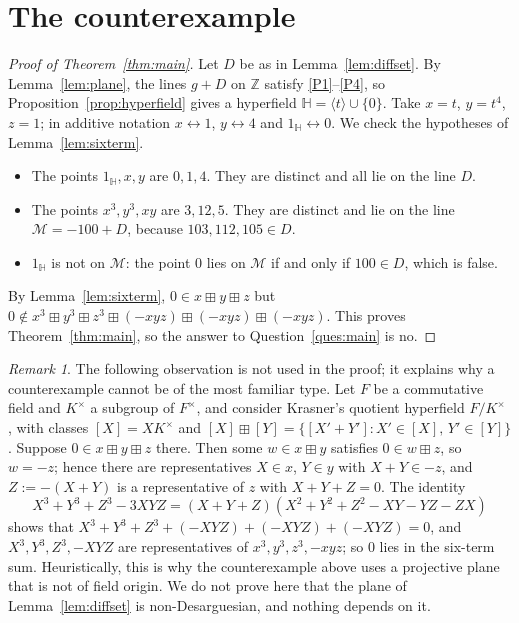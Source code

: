 \documentclass[11pt]{article}
\theoremstyle{definition}
\theoremstyle{remark}
\newtheorem{remark}[theorem]{Remark}
\newcommand{\HH}{\mathbb{H}}
\newcommand{\Z}{\mathbb{Z}}
\newcommand{\bp}{\boxplus}
\begin{document}
\section{The counterexample}

\begin{proof}[Proof of Theorem~\ref{thm:main}]
Let $D$ be as in Lemma~\ref{lem:diffset}. By Lemma~\ref{lem:plane}, the lines $g+D$ on $\Z$ satisfy \ref{P1}--\ref{P4}, so Proposition~\ref{prop:hyperfield} gives a hyperfield $\HH=\langle t\rangle\cup\{0\}$. Take $x=t$, $y=t^4$, $z=1$; in additive notation $x\leftrightarrow1$, $y\leftrightarrow4$ and $1_{\HH}\leftrightarrow0$. We check the hypotheses of Lemma~\ref{lem:sixterm}.
\begin{itemize}[nosep]
\item The points $1_{\HH},x,y$ are $0,1,4$. They are distinct and all lie on the line $D$.
\item The points $x^3,y^3,xy$ are $3,12,5$. They are distinct and lie on the line $\mathcal M=-100+D$, because $103,112,105\in D$.
\item $1_{\HH}$ is not on $\mathcal M$: the point $0$ lies on $\mathcal M$ if and only if $100\in D$, which is false.
\end{itemize}
By Lemma~\ref{lem:sixterm}, $0\in x\bp y\bp z$ but $0\notin x^3\bp y^3\bp z^3\bp(-xyz)\bp(-xyz)\bp(-xyz)$. This proves Theorem~\ref{thm:main}, so the answer to Question~\ref{ques:main} is no.
\end{proof}

\begin{remark}\label{rem:quotient}
The following observation is not used in the proof; it explains why a counterexample cannot be of the most familiar type. Let $F$ be a commutative field and $K^\times$ a subgroup of $F^\times$, and consider Krasner's quotient hyperfield $F/K^\times$ \cite{Kr83}, with classes $[X]=XK^\times$ and $[X]\bp[Y]=\{[X'+Y']:X'\in[X],\,Y'\in[Y]\}$. Suppose $0\in x\bp y\bp z$ there. Then some $w\in x\bp y$ satisfies $0\in w\bp z$, so $w=-z$; hence there are representatives $X\in x$, $Y\in y$ with $X+Y\in -z$, and $Z:=-(X+Y)$ is a representative of $z$ with $X+Y+Z=0$. The identity
\[
X^3+Y^3+Z^3-3XYZ=(X+Y+Z)(X^2+Y^2+Z^2-XY-YZ-ZX)
\]
shows that $X^3+Y^3+Z^3+(-XYZ)+(-XYZ)+(-XYZ)=0$, and $X^3,Y^3,Z^3,-XYZ$ are representatives of $x^3,y^3,z^3,-xyz$; so $0$ lies in the six-term sum. Heuristically, this is why the counterexample above uses a projective plane that is not of field origin. We do not prove here that the plane of Lemma~\ref{lem:diffset} is non-Desarguesian, and nothing depends on it.
\end{remark}
\end{document}
